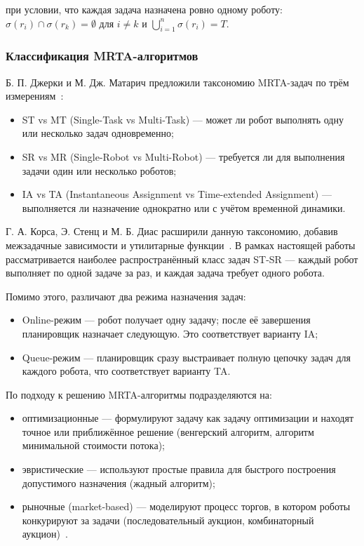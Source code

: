 при условии, что каждая задача назначена ровно одному роботу: $\sigma(r_i) \cap \sigma(r_k) = \emptyset$ для $i \neq k$ и $\bigcup_{i=1}^{n} \sigma(r_i) = T$.

\subsubsection{Классификация MRTA-алгоритмов}

Б. П. Джерки и М. Дж. Матарич предложили таксономию MRTA-задач по трём измерениям~\cite{gerkey2004taxonomy}:

\begin{itemize}
    \item ST vs MT (Single-Task vs Multi-Task) --- может ли робот выполнять одну или несколько задач одновременно;
    \item SR vs MR (Single-Robot vs Multi-Robot) --- требуется ли для выполнения задачи один или несколько роботов;
    \item IA vs TA (Instantaneous Assignment vs Time-extended Assignment) --- выполняется ли назначение однократно или с учётом временной динамики.
\end{itemize}

Г. А. Корса, Э. Стенц и М. Б. Диас расширили данную таксономию, добавив межзадачные зависимости и утилитарные функции~\cite{korsah2013taxonomy}. В рамках настоящей работы рассматривается наиболее распространённый класс задач ST-SR --- каждый робот выполняет по одной задаче за раз, и каждая задача требует одного робота.

Помимо этого, различают два режима назначения задач:

\begin{itemize}
    \item Online-режим --- робот получает одну задачу; после её завершения планировщик назначает следующую. Это соответствует варианту IA;
    \item Queue-режим --- планировщик сразу выстраивает полную цепочку задач для каждого робота, что соответствует варианту TA.
\end{itemize}

По подходу к решению MRTA-алгоритмы подразделяются на:

\begin{itemize}
    \item оптимизационные --- формулируют задачу как задачу оптимизации и находят точное или приближённое решение (венгерский алгоритм, алгоритм минимальной стоимости потока);
    \item эвристические --- используют простые правила для быстрого построения допустимого назначения (жадный алгоритм);
    \item рыночные (market-based) --- моделируют процесс торгов, в котором роботы конкурируют за задачи (последовательный аукцион, комбинаторный аукцион)~\cite{dias2006market}.
\end{itemize}

